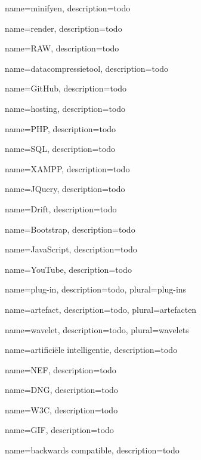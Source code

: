 {
	name={minifyen},
	description={todo}
}

{
	name={render},
	description={todo}
}

{
	name={RAW},
	description={todo}
}

{
	name={datacompressietool},
	description={todo}
}

{
	name={GitHub},
	description={todo}
}

{
	name={hosting},
	description={todo}
}

{
	name={PHP},
	description={todo}
}

{
	name={SQL},
	description={todo}
}

{
	name={XAMPP},
	description={todo}
}

{
	name={JQuery},
	description={todo}
}

{
	name={Drift},
	description={todo}
}

{
	name={Bootstrap},
	description={todo}
}

{
	name={JavaScript},
	description={todo}
}
% 

{
	name={YouTube},
	description={todo}
}

{
	name={plug-in},
	description={todo},
	plural={plug-ins}
}

{
	name={artefact},
	description={todo},
	plural={artefacten}
}

{
	name={wavelet},
	description={todo},
	plural={wavelets}
}

{
	name={artificiële intelligentie},
	description={todo}
}

{
	name={NEF},
	description={todo}
}

{
	name={DNG},
	description={todo}
}

{
	name={W3C},
	description={todo}
}

{
	name={GIF},
	description={todo}
}

{
	name={backwards compatible},
	description={todo}
}

